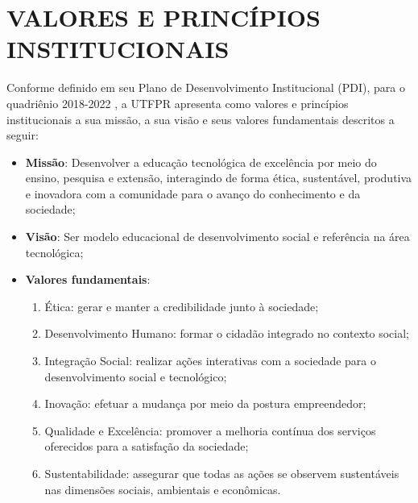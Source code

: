 \chapter{VALORES E PRINCÍPIOS INSTITUCIONAIS}

Conforme definido em seu Plano de Desenvolvimento Institucional (PDI), para o quadriênio 2018-2022 \cite{pdiutfpr}, a UTFPR apresenta como valores e princípios institucionais a sua missão, a sua visão e seus valores fundamentais descritos a seguir:


\begin{itemize}[label={}]
	\item \textbf{Missão}: Desenvolver a educação tecnológica de excelência por meio do ensino, pesquisa e extensão, interagindo de forma ética, sustentável, produtiva e inovadora com a comunidade para o avanço do conhecimento e da sociedade;
	
	\item \textbf{Visão}: Ser modelo educacional de desenvolvimento social e referência na área tecnológica;
	
	\item \textbf{Valores fundamentais}:
	
	\begin{enumerate}
		\item Ética: gerar e manter a credibilidade junto à sociedade;
		
		\item Desenvolvimento Humano: formar o cidadão integrado no contexto social;
		\item Integração Social: realizar ações interativas com a sociedade para o desenvolvimento social e tecnológico;
		\item Inovação: efetuar a mudança por meio da postura empreendedor;
		\item Qualidade e Excelência: promover a melhoria contínua dos serviços oferecidos para a satisfação da sociedade;
		\item Sustentabilidade: assegurar que todas as ações se observem sustentáveis nas dimensões sociais, ambientais e econômicas.
		
	\end{enumerate}

\end{itemize}
